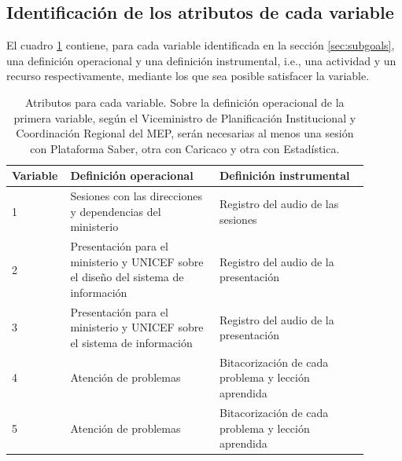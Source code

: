 \documentclass[a4paper, 9pt, conference]{article}              %
\theoremstyle{definition}
\begin{document}
\subsection{Identificaci\'on de los atributos de cada variable}

El cuadro \ref{attrs} contiene, para cada variable identificada en la secci\'on \ref{sec:subgoals}, una definici\'on operacional y una definici\'on instrumental, i.e., una actividad y un recurso respectivamente, mediante los que sea posible satisfacer la variable.

\begin{table}[H]
	\centering
	\caption{Atributos para cada variable. Sobre la definici\'on operacional de la primera variable, seg\'un el Viceministro de Planificaci\'on Institucional y Coordinaci\'on Regional del MEP, ser\'an necesarias al menos una sesi\'on con Plataforma Saber, otra con Caricaco y otra con Estad\'istica.}
	\label{attrs}
	\begin{tabular}{p{0.1\linewidth}p{0.4\linewidth}p{0.4\linewidth}}
		\rowcolor[HTML]{FFFFFF}
		{\color[HTML]{000000} Variable} & {\color[HTML]{000000} Definici\'on operacional}                                           & {\color[HTML]{000000} Definici\'on instrumental} \\
		\hline
		1                               & Sesiones con las direcciones y dependencias del ministerio                                & Registro del audio de las sesiones \\
		2                               & Presentaci\'on para el ministerio y UNICEF sobre el dise\~no del sistema de informaci\'on & Registro del audio de la presentaci\'on \\
		3                               & Presentaci\'on para el ministerio y UNICEF sobre el sistema de informaci\'on              & Registro del audio de la presentaci\'on \\
		4                               & Atenci\'on de problemas                                                                   & Bitacorizaci\'on de cada problema y lecci\'on aprendida \\
		5                               & Atenci\'on de problemas                                                                   & Bitacorizaci\'on de cada problema y lecci\'on aprendida \\
	\end{tabular}
\end{table}

\end{document}
